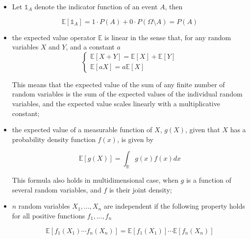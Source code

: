 \begin{itemize}
\tightlist
\item
Let \(\mathbb{1}_{A}\) denote the indicator function of an event
\(A\), then

\begin{equation}
	\mathbb{E}[\mathbb{1}_{A}] = 1\cdot P(A)+0\cdot P(\Omega \setminus A)= P(A)
\end{equation}

\item
the expected value operator \(\mathbb{E}\) is linear in the sense
that, for any random variables \(X\) and \(Y\), and a constant \(a\)
\begin{equation}
\begin{cases}
\mathbb{E}[X+Y] = \mathbb{E}[X] + \mathbb{E}[Y] \\
\mathbb{E}[aX] = a\mathbb{E}[X]
\end{cases}
\end{equation}

This means that the expected value of the sum of any finite number of
random variables is the sum of the expected values of the individual
random variables, and the expected value scales linearly with a
multiplicative constant;

\item
the expected value of a measurable function of \(X\), \(g(X)\), given
that \(X\) has a probability density function \(f(x)\), is given by

\begin{equation}
	\mathbb{E}[g(X)] = \int _{\mathbb {R} }g(x)f(x) dx
\end{equation}

This formula also holds in multidimensional case, when \(g\) is a
function of several random variables, and \(f\) is their joint density;

\item
\(n\) random variables \(X_1 ,\ldots , X_n\) are independent if the
following property holds for all positive functions
\(f_1 ,\ldots , f_n\)

\begin{equation}
	\mathbb{E}[f_1 (X_1 )\cdots f_n (X_n )] = \mathbb{E}[f_1 ( X_1 )] \cdots \mathbb{E}[f_n (X_n )]
\end{equation}
\end{itemize}


%


